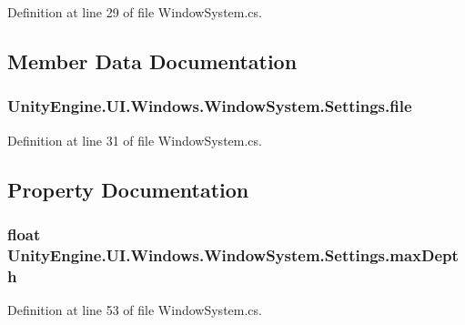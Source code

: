 Definition at line 29 of file Window\+System.\+cs.



\subsection{Member Data Documentation}
\hypertarget{class_unity_engine_1_1_u_i_1_1_windows_1_1_window_system_1_1_settings_aea20099c3aea8c1729e196b655a1521f}{}
\subsubsection[{file}]{ Unity\+Engine.\+U\+I.\+Windows.\+Window\+System.\+Settings.\+file}\label{class_unity_engine_1_1_u_i_1_1_windows_1_1_window_system_1_1_settings_aea20099c3aea8c1729e196b655a1521f}


Definition at line 31 of file Window\+System.\+cs.



\subsection{Property Documentation}
\hypertarget{class_unity_engine_1_1_u_i_1_1_windows_1_1_window_system_1_1_settings_a17c2e00a70a5c62a18e0a1d4f7246f9a}{}
\subsubsection[{max\+Depth}]{\setlength{\rightskip}{0pt plus 5cm}float Unity\+Engine.\+U\+I.\+Windows.\+Window\+System.\+Settings.\+max\+Depth\hspace{0.3cm}{\ttfamily [get]}}\label{class_unity_engine_1_1_u_i_1_1_windows_1_1_window_system_1_1_settings_a17c2e00a70a5c62a18e0a1d4f7246f9a}


Definition at line 53 of file Window\+System.\+cs.

